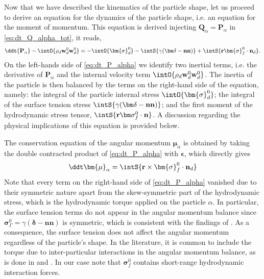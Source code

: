 Now that we have described the kinematics   of the particle shape, let us proceed to derive an equation for the dynamics of the particle shape, i.e. an equation for the moment of momentum. 
This equation is derived injecting $\textbf{Q}_\alpha = \textbf{P}_\alpha$ in \ref{eq:dt_Q_alpha_tot}, it reads, 
\begin{equation}
    \ddt {\textbf{P}_\alpha}
    - \intO{ \rho_d  \textbf{w}_d^0 \textbf{w}_d^0 }
    = 
    - \intO{\bm{\sigma}_d^0}
    - \intS{ 
        \gamma (\bm\delta - \textbf{nn})
    }
    + \intS{ \textbf{r}\bm{\sigma}_f^0\cdot \textbf{n}_d}.
    \label{eq:dt_P_alpha}
\end{equation}
On the left-hands side of \ref{eq:dt_P_alpha} we identify two inertial terms, i.e. the derivative of $\textbf{P}_\alpha$ and the internal velocity term $\intO{\rho_d\textbf{w}_d^0\textbf{w}_d^0 }$.
The inertia of the particle is then balanced by the terms on the right-hand side of the equation, namely: 
the integral of the particle internal stress $\intO{ \bm{\sigma}_d^0}$; 
the integral of the surface tension stress $\intS{ \gamma (\bm\delta- \textbf{nn}) }$; 
and the first moment of the hydrodynamic stress tensor, $\intS{\textbf{r}\bm\sigma_f^0\cdot \textbf{n}}$.
A discussion regarding the physical implications of this equation is provided below. 

The conservation equation of the angular momentum $\bm{\mu}_\alpha$ is obtained by taking the double contracted product of \ref{eq:dt_P_alpha} with $\bm\epsilon$, which directly gives
\begin{equation}
    \ddt\bm{\mu}_\alpha
    =  
    \intS{ \textbf{r} \times \bm{\sigma}_f^0\cdot \textbf{n}_d }
    \label{eq:dt_mu_alpha}
\end{equation}
Note that every term on the right-hand side of \ref{eq:dt_P_alpha} vanished due to their symmetric nature apart from the skew-symmetric part of the hydrodynamic stress, which is the hydrodynamic torque applied on the particle $\alpha$.
In particular, the surface tension terms do not appear in the angular momentum balance since $\bm\sigma_\Gamma^0 = \gamma (\bm\delta-\textbf{nn})$ is symmetric, which is consistent with the findings of \citet{hesla1993note}. 
As a consequence, the surface tension does not affect the angular momentum regardless of the particle's shape. 
In the literature, it is common to include the torque due to inter-particular interactions in the angular momentum balance, as is done in \citet{jackson1997locally} and \citet{zhang1997momentum}.
In our case note that $\bm{\sigma}_f^0$ contains short-range hydrodynamic interaction forces. 


